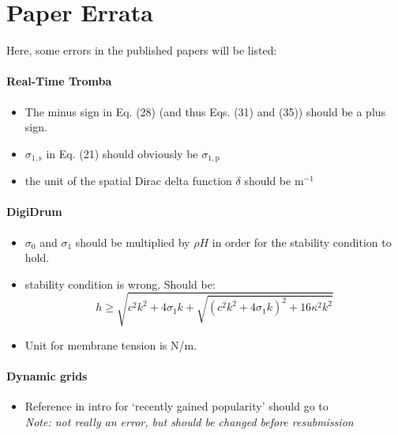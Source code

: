 \chapter*{Paper Errata}
Here, some errors in the published papers will be listed:
\\
\subsubsection{Real-Time Tromba \citeP[D]}
\begin{itemize}
    \item The minus sign in Eq. (28) (and thus Eqs. (31) and (35)) should be a plus sign.
    \item $\sigma_{1,\text{s}}$ in Eq. (21) should obviously be $\sigma_{1,\text{p}}$
    \item the unit of the spatial Dirac delta function $\delta$ should be m$^{-1}$
\end{itemize}
%
\subsubsection{DigiDrum \citeP[F]}
\begin{itemize}
    \item $\sigma_0$ and $\sigma_1$ should be multiplied by $\rho H$ in order for the stability condition to hold.
    \item stability condition is wrong. Should be: 
    \begin{equation}
        h \geq \sqrt{c^2k^2 + 4\sigma_1k + \sqrt{(c^2k^2+4\sigma_1k)^2 + 16\kappa^2k^2}}
    \end{equation}
    \item Unit for membrane tension is N/m.
\end{itemize}
%
\subsubsection{Dynamic grids \citeP[G]}
\begin{itemize}
    \item Reference in intro for `recently gained popularity' should go to \cite{Bilbao2019CMJa} \\
    \textit{Note: not really an error, but should be changed before resubmission}
\end{itemize}